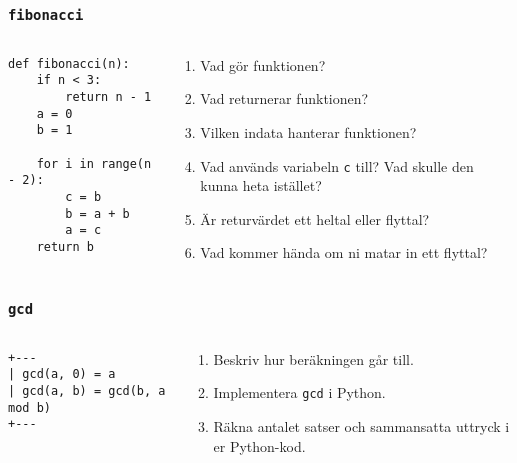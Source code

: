 \documentclass{beamer}
\begin{document}
  \begin{frame}[fragile]
    \frametitle{\texttt{fibonacci}}

    \begin{columns}
      \begin{column}{0.48\textwidth}
        \begin{verbatim}
def fibonacci(n):
    if n < 3:
        return n - 1
    a = 0
    b = 1

    for i in range(n - 2):
        c = b
        b = a + b
        a = c
    return b
        \end{verbatim}
      \end{column}%
      \begin{column}{0.48\textwidth}
        \begin{enumerate}
          \item Vad gör funktionen?
          \item Vad returnerar funktionen?
          \item Vilken indata hanterar funktionen?
          \item Vad används variabeln \texttt{c} till? Vad skulle den kunna heta istället?
          \item Är returvärdet ett heltal eller flyttal?
          \item Vad kommer hända om ni matar in ett flyttal?
        \end{enumerate}
      \end{column}%
    \end{columns}
  \end{frame}

  \begin{frame}[fragile]
    \frametitle{\texttt{gcd}}

    \begin{columns}
      \begin{column}{0.48\textwidth}
        \begin{verbatim}
+---
| gcd(a, 0) = a
| gcd(a, b) = gcd(b, a mod b)
+---
        \end{verbatim}
      \end{column}%
      \begin{column}{0.48\textwidth}
        \begin{enumerate}
          \item Beskriv hur beräkningen går till.
          \item Implementera \texttt{gcd} i Python.
          \item Räkna antalet satser och sammansatta uttryck i er Python-kod.
        \end{enumerate}
      \end{column}%
    \end{columns}
  \end{frame}
\end{document}
